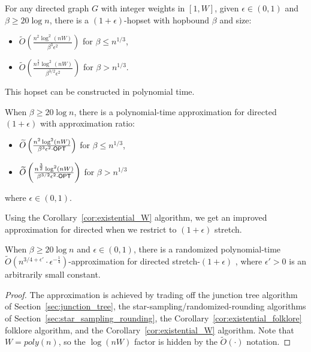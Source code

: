 \begin{lemma}
    For any directed graph $G$ with integer weights in $[1,W]$, given $\epsilon \in (0,1)$ and $\beta \geq  20\log n$, there is a $(1+\epsilon)$-hopset with hopbound $\beta$ and size:
    \begin{itemize}
        \item $\widetilde{O}\left(\frac{n^2\log^2(nW)}{\beta^3 \epsilon^2  }\right)$ for $\beta \leq n^{1/3}$,
        \item $\widetilde{O}\left(\frac{n^{\frac{3}{2}} \log^2(nW)}{\beta^{3/2} \epsilon^2}\right)$ for $\beta >n^{1/3}$.
    \end{itemize} 
    This hopset can be constructed in polynomial time.
\end{lemma}
\begin{corollary} \label{cor:existential_W}
    When $\beta \geq 20\log n$, there is a polynomial-time approximation for directed $(1+\epsilon)$ {\hopset} with approximation ratio:
        \begin{itemize}
        \item $\widetilde{O}\left(\frac{n^2\log^2(nW)}{\beta^3 \epsilon^2 \cdot {\sf OPT}  }\right)$ for $\beta \leq n^{1/3}$,
        \item $\widetilde{O}\left(\frac{n^{\frac{3}{2}} \log^2(nW)}{\beta^{3/2} \epsilon^2 \cdot {\sf OPT}}\right)$ for $\beta >n^{1/3}$
    \end{itemize}
    where $\epsilon \in (0,1)$.
\end{corollary}

Using the Corollary~\ref{cor:existential_W} algorithm, we get an improved approximation for directed {\hopset} when we restrict to $(1+\epsilon)$ stretch. 

\begin{theorem} \label{thm:dir_eps}
    When $\beta \geq 20\log n$ and $\epsilon \in (0,1)$, there is a randomized polynomial-time $\widetilde{O}(n^{3/4 + \epsilon'} \cdot \epsilon^{-\frac{1}{4}})$-approximation for directed stretch-$(1+\epsilon)$ {\hopset}, where $\epsilon' > 0$ is an arbitrarily small constant.
\end{theorem}
\begin{proof}
    The approximation is achieved by trading off the junction tree algorithm of Section~\ref{sec:junction_tree}, the star-sampling/randomized-rounding algorithms of Section~\ref{sec:star_sampling_rounding}, the Corollary~\ref{cor:existential_folklore} folklore algorithm, and the Corollary~\ref{cor:existential_W} algorithm. Note that $W = poly(n)$, so the $\log(nW)$ factor is hidden by the $\widetilde{O}(\cdot)$ notation.
\end{proof}


